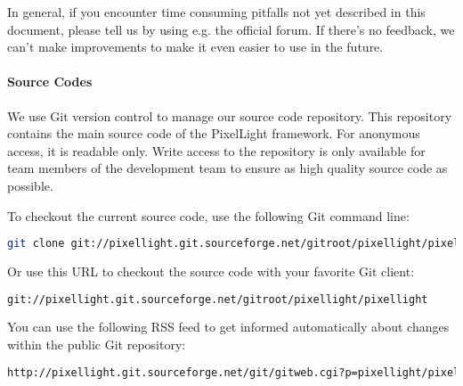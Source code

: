 In general, if you encounter time consuming pitfalls not yet described in this document, please tell us by using e.g. the official forum. If there's no feedback, we can't make improvements to make it even easier to use in the future.


\paragraph{Source Codes}
We use Git version control to manage our source code repository. This repository contains the main source code of the PixelLight framework. For anonymous access, it is readable only. Write access to the repository is only available for team members of the development team to ensure as high quality source code as possible.

To checkout the current source code, use the following Git command line:
\begin{lstlisting}[language=sh]
git clone git://pixellight.git.sourceforge.net/gitroot/pixellight/pixellight
\end{lstlisting}

Or use this \ac{URL} to checkout the source code with your favorite Git client:
\begin{lstlisting}[language=sh]
git://pixellight.git.sourceforge.net/gitroot/pixellight/pixellight
\end{lstlisting}

You can use the following RSS feed to get informed automatically about changes within the public Git repository:
\begin{lstlisting}[language=sh]
http://pixellight.git.sourceforge.net/git/gitweb.cgi?p=pixellight/pixellight;a=rss
\end{lstlisting}
